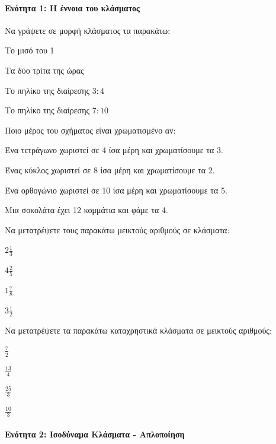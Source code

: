 \documentclass[11pt,a4paper,modern]{FFExercises}
\begin{document}

\paragraph{Ενότητα 1: Η έννοια του κλάσματος}

    \askhsh Να γράψετε σε μορφή κλάσματος τα παρακάτω:
    \begin{alist}
        \item Το μισό του 1
        \item Τα δύο τρίτα της ώρας
        \item Το πηλίκο της διαίρεσης $3 : 4$
        \item Το πηλίκο της διαίρεσης $7 : 10$
    \end{alist}

    \askhsh Ποιο μέρος του σχήματος είναι χρωματισμένο αν:
    \begin{alist}
        \item Ένα τετράγωνο χωριστεί σε 4 ίσα μέρη και χρωματίσουμε τα 3.
        \item Ένας κύκλος χωριστεί σε 8 ίσα μέρη και χρωματίσουμε τα 2.
        \item Ένα ορθογώνιο χωριστεί σε 10 ίσα μέρη και χρωματίσουμε τα 5.
        \item Μια σοκολάτα έχει 12 κομμάτια και φάμε τα 4.
    \end{alist}

    \askhsh Να μετατρέψετε τους παρακάτω μεικτούς αριθμούς σε κλάσματα:
    \begin{alist}
        \item $2 \frac{1}{3}$
        \item $4 \frac{2}{5}$
        \item $1 \frac{7}{8}$
        \item $3 \frac{1}{2}$
    \end{alist}

    \askhsh Να μετατρέψετε τα παρακάτω καταχρηστικά κλάσματα σε μεικτούς αριθμούς:
    \begin{alist}
        \item $\frac{7}{2}$
        \item $\frac{13}{4}$
        \item $\frac{25}{3}$
        \item $\frac{10}{3}$
    \end{alist}

\paragraph{Ενότητα 2: Ισοδύναμα Κλάσματα - Απλοποίηση}
\end{document}
